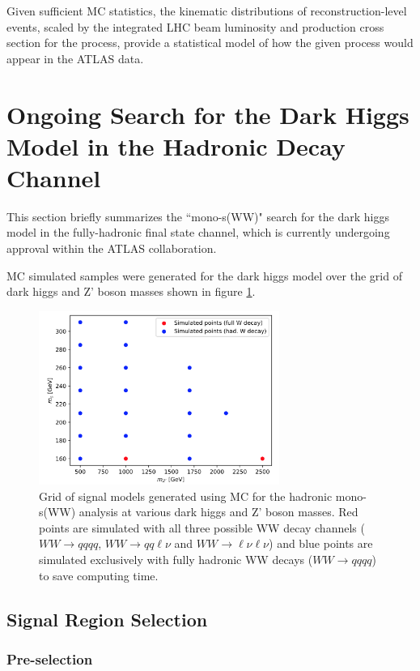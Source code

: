 \documentclass[12pt]{article}
\begin{document}
Given sufficient MC statistics, the kinematic distributions of reconstruction-level events, scaled by the integrated LHC beam luminosity and production cross section for the process, provide a statistical model of how the given process would appear in the ATLAS data.

\section{Ongoing Search for the Dark Higgs Model in the Hadronic Decay Channel}

This section briefly summarizes the ``mono-s(WW)" search for the dark higgs model in the fully-hadronic final state channel, which is currently undergoing approval within the ATLAS collaboration. 

MC simulated samples were generated for the dark higgs model over the grid of dark higgs and Z' boson masses shown in figure \ref{fig:had_grid}. 

 \begin{figure}[H]
	\centering
	\includegraphics[width=0.7\textwidth]{figures/had_grid.png}
	\caption[]{Grid of signal models generated using MC for the hadronic mono-s(WW) analysis at various dark higgs and Z' boson masses. Red points are simulated with all three possible WW decay channels ($WW \rightarrow qqqq$, $WW \rightarrow qq\ell\nu$ and $WW \rightarrow \ell\nu\ell\nu$) and blue points are simulated exclusively with fully hadronic WW decays ($WW \rightarrow qqqq$) to save computing time.}
	\label{fig:had_grid} 
\end{figure}

\subsection{Signal Region Selection}

\subsubsection{Pre-selection}
\end{document}
